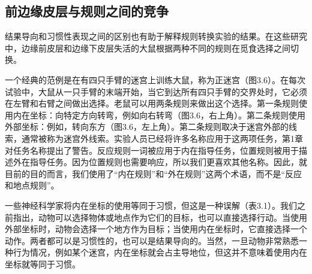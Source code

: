\subsection{前边缘皮层与规则之间的竞争}
结果导向和习惯性表现之间的区别也有助于解释规则转换实验的结果。在这些研究中，边缘前皮层和边缘下皮层失活的大鼠根据两种不同的规则在觅食选择之间切换。\par
一个经典的范例是在有四只手臂的迷宫上训练大鼠，称为正迷宫（图3.6）。在每次试验中，大鼠从一只手臂的末端开始，当它到达所有四只手臂的交界处时，它必须在左臂和右臂之间做出选择。老鼠可以用两条规则来做出这个选择。第一条规则使用内在坐标：向特定方向转弯，例如向右转弯（图3.6，右上角）。第二条规则使用外部坐标：例如，转向东方（图3.6，左上角）。第二条规则取决于迷宫外部的线索，通常被称为迷宫外线索。实验人员已经将许多名称应用于这两项任务，第1章对任务名称提出了警告。反应规则一词被应用于内在指导任务，位置规则被用于描述外在指导任务。因为位置规则也需要响应，所以我们更喜欢其他名称。因此，就目前的目的而言，我们使用了“内在规则”和“外在规则”这两个术语，而不是“反应和地点规则”。\par
一些神经科学家将内在坐标的使用等同于习惯，但这是一种误解（表3.1）。我们之前指出，动物可以选择物体或地点作为它们的目标，也可以直接选择行动。当使用外部坐标时，动物会选择一个地方作为目标；当使用内在坐标时，它直接选择一个动作。两者都可以是习惯性的，也可以是结果导向的。当然，一旦动物非常熟悉一种行为情况，例如某个迷宫，内在坐标就会占主导地位，但这并不意味着使用内在坐标就等同于习惯。\par

